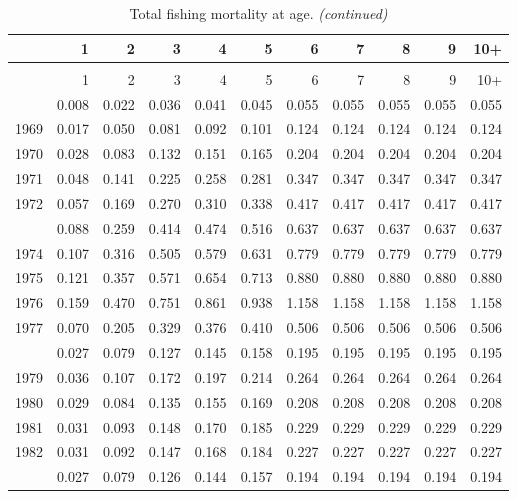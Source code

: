 \documentclass[
]{article}
\begin{document}
\begin{longtable}[t]{lrrrrrrrrrr}
\caption{\label{tab:FAA-tot-table}Total fishing mortality at age.}\\
\toprule
  & 1 & 2 & 3 & 4 & 5 & 6 & 7 & 8 & 9 & 10+\\
\midrule
\endfirsthead
\caption[]{Total fishing mortality at age. \textit{(continued)}}\\
\toprule
  & 1 & 2 & 3 & 4 & 5 & 6 & 7 & 8 & 9 & 10+\\
\midrule
\endhead

\endfoot
\bottomrule
\endlastfoot
1968 & 0.008 & 0.022 & 0.036 & 0.041 & 0.045 & 0.055 & 0.055 & 0.055 & 0.055 & 0.055\\
1969 & 0.017 & 0.050 & 0.081 & 0.092 & 0.101 & 0.124 & 0.124 & 0.124 & 0.124 & 0.124\\
1970 & 0.028 & 0.083 & 0.132 & 0.151 & 0.165 & 0.204 & 0.204 & 0.204 & 0.204 & 0.204\\
1971 & 0.048 & 0.141 & 0.225 & 0.258 & 0.281 & 0.347 & 0.347 & 0.347 & 0.347 & 0.347\\
1972 & 0.057 & 0.169 & 0.270 & 0.310 & 0.338 & 0.417 & 0.417 & 0.417 & 0.417 & 0.417\\
\addlinespace
1973 & 0.088 & 0.259 & 0.414 & 0.474 & 0.516 & 0.637 & 0.637 & 0.637 & 0.637 & 0.637\\
1974 & 0.107 & 0.316 & 0.505 & 0.579 & 0.631 & 0.779 & 0.779 & 0.779 & 0.779 & 0.779\\
1975 & 0.121 & 0.357 & 0.571 & 0.654 & 0.713 & 0.880 & 0.880 & 0.880 & 0.880 & 0.880\\
1976 & 0.159 & 0.470 & 0.751 & 0.861 & 0.938 & 1.158 & 1.158 & 1.158 & 1.158 & 1.158\\
1977 & 0.070 & 0.205 & 0.329 & 0.376 & 0.410 & 0.506 & 0.506 & 0.506 & 0.506 & 0.506\\
\addlinespace
1978 & 0.027 & 0.079 & 0.127 & 0.145 & 0.158 & 0.195 & 0.195 & 0.195 & 0.195 & 0.195\\
1979 & 0.036 & 0.107 & 0.172 & 0.197 & 0.214 & 0.264 & 0.264 & 0.264 & 0.264 & 0.264\\
1980 & 0.029 & 0.084 & 0.135 & 0.155 & 0.169 & 0.208 & 0.208 & 0.208 & 0.208 & 0.208\\
1981 & 0.031 & 0.093 & 0.148 & 0.170 & 0.185 & 0.229 & 0.229 & 0.229 & 0.229 & 0.229\\
1982 & 0.031 & 0.092 & 0.147 & 0.168 & 0.184 & 0.227 & 0.227 & 0.227 & 0.227 & 0.227\\
\addlinespace
1983 & 0.027 & 0.079 & 0.126 & 0.144 & 0.157 & 0.194 & 0.194 & 0.194 & 0.194 & 0.194\\

\end{longtable}
\end{document}
